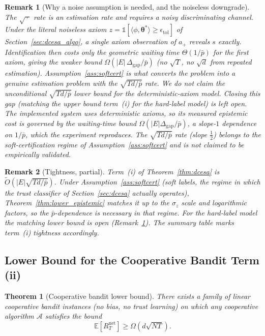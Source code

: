\documentclass[11pt]{article}
\newtheorem{theorem}{Theorem}[section]
\newtheorem*{remark}{Remark}
\begin{document}
\begin{remark}[Why a noise assumption is needed, and the noiseless
downgrade]\label{rem:epi_downgrade}
The $\sqrt{\,\cdot\,}$ rate is an estimation rate and \emph{requires} a
noisy discriminating channel.  Under the literal noiseless axiom
$z=\mathbb{1}[\langle\phi,\bm{\theta}^{\!*}\rangle\geq\epsilon_{\mathrm{tol}}]$
of Section~\ref{sec:dcesa_algo}, a single axiom observation of $a_+$
reveals $s$ \emph{exactly}. Identification then costs only the
geometric waiting time $\Theta(1/\bar p)$ for the first axiom, giving
the weaker bound $\Omega(|E|\,\Delta_{\mathrm{gap}}/\bar p)$ (no
$\sqrt{T}$, no $\sqrt d$ from repeated estimation).
Assumption~\ref{ass:softcert} is what converts the problem into a
genuine estimation problem with the $\sqrt{Td/\bar p}$ rate.  We do not
claim the unconditional $\sqrt{Td/\bar p}$ lower bound for the
deterministic-axiom model. Closing this gap (matching the
upper bound term~(i) for the hard-label model) is left \emph{open}.
The implemented system uses deterministic axioms, so its measured
epistemic cost is governed by the waiting-time bound
$\Omega(|E|\Delta_{\mathrm{gap}}/\bar p)$, a slope-$1$ dependence on
$1/\bar p$, which the experiment reproduces.  The $\sqrt{Td/\bar p}$ rate
(slope $\tfrac12$) belongs to the soft-certification regime of
Assumption~\ref{ass:softcert} and is \emph{not} claimed to be
empirically validated.
\end{remark}

\begin{remark}[Tightness, partial]\label{rem:epi_tight}
Term~(i) of Theorem~\ref{thm:dcesa} is
$\widetilde{O}(|E|\sqrt{Td/\bar{p}})$.  Under
Assumption~\ref{ass:softcert} (soft labels, the regime in which the
trust \emph{classifier} of Section~\ref{sec:dcesa} actually operates),
Theorem~\ref{thm:lower_epistemic} matches it up to the $\sigma_z$ scale
and logarithmic factors, so the $\bar p$-dependence is necessary
\emph{in that regime}.  For the hard-label model the matching lower
bound is open (Remark~\ref{rem:epi_downgrade}). The summary table marks
term~(i) tightness accordingly.
\end{remark}

\subsection{Lower Bound for the Cooperative Bandit Term (ii)}

\begin{theorem}[Cooperative bandit lower bound]\label{thm:lower_coop}
There exists a family of linear cooperative bandit instances
(no bias, no trust learning) on which any cooperative algorithm
$\mathcal{A}$ satisfies the bound
\[
\mathbb{E}[R_T^{\mathrm{net}}]\geq\Omega(d\sqrt{NT}).
\]
\end{theorem}
\end{document}
